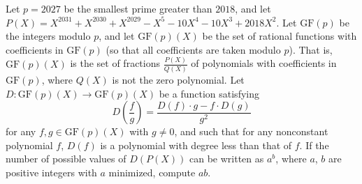 Let $p = 2027$ be the smallest prime greater than $2018$, and let $P(X) = X^{2031}+X^{2030}+X^{2029}-X^5-10X^4-10X^3+2018X^2$. Let $\mathrm{GF}(p)$ be the integers modulo $p$, and let $\mathrm{GF}(p)(X)$ be the set of rational functions with coefficients in $\mathrm{GF}(p)$ (so that all coefficients are taken modulo $p$). That is, $\mathrm{GF}(p)(X)$ is the set of fractions $\frac{P(X)}{Q(X)}$ of polynomials with coefficients in $\mathrm{GF}(p)$, where $Q(X)$ is not the zero polynomial. Let $D\colon \mathrm{GF}(p)(X)\to \mathrm{GF}(p)(X)$ be a function satisfying \[
	  D\left(\frac fg\right) = \frac{D(f)\cdot g - f\cdot D(g)}{g^2}
\]for any $f,g\in \mathrm{GF}(p)(X)$ with $g\neq 0$, and such that for any nonconstant polynomial $f$, $D(f)$ is a polynomial with degree less than that of $f$. If the number of possible values of $D(P(X))$ can be written as $a^b$, where $a$, $b$ are positive integers with $a$ minimized, compute $ab$.
